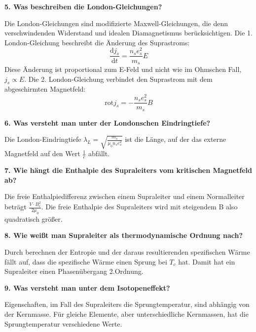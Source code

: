 \noindent\textbf{5. Was beschreiben die London-Gleichungen?}\\
\begin{addmargin}[25pt]{0pt}
Die London-Gleichungen sind modifizierte Maxwell-Gleichungen, die denn verschwindenden Widerstand und idealen Diamagnetismus berücksichtigen. Die 1. London-Gleichung beschreibt die Änderung des Suprastroms:
\begin{equation}
    \frac{\text{d}j_s}{\text{d}t}=\frac{n_se_s^2}{m_s}E
\end{equation}
Diese Änderung ist proportional zum E-Feld und nicht wie im Ohmschen Fall, $j_s\propto E$.
Die 2. London-Gleichung verbindet den Suprastrom mit dem abgeschirmten Magnetfeld:
\begin{equation}
    \text{rot} j_s = -\frac{n_se_s^2}{m_s}B
\end{equation}
\end{addmargin}

\noindent\textbf{6. Was versteht man unter der Londonschen Eindringtiefe?}\\
\begin{addmargin}[25pt]{0pt}
Die London-Eindringtiefe $\lambda_L=\sqrt{\frac{m_s}{\mu_0n_se_s^2}}$ ist die Länge, auf der das externe Magnetfeld auf den Wert $\frac{1}{e}$ abfällt.
\end{addmargin}

\noindent\textbf{7. Wie hängt die Enthalpie des Supraleiters vom kritischen Magnetfeld ab?}\\
\begin{addmargin}[25pt]{0pt}
Die freie Enthalpiedifferenz zwischen einem Supraleiter und einem Normalleiter beträgt $\frac{V\cdot B_c^2}{2\mu_0}$. Die freie Enthalpie des Supraleiters wird mit steigendem B also quadratisch größer.
\end{addmargin}

\noindent\textbf{8. Wie weißt man Supraleiter als thermodynamische Ordnung nach?}\\
\begin{addmargin}[25pt]{0pt}
Durch berechnen der Entropie und der daraus resultierenden spezifischen Wärme fällt auf, dass die spezifische Wärme einen Sprung bei $T_c$ hat. Damit hat ein Supraleiter einen Phasenübergang 2.Ordnung.
\end{addmargin}

\noindent\textbf{9. Was versteht man unter dem Isotopeneffekt?}\\
\begin{addmargin}[25pt]{0pt}
Eigenschaften, im Fall des Supraleiters die Sprungtemperatur, sind abhängig von der Kernmasse. Für gleiche Elemente, aber unterschiedliche Kernmassen, hat die Sprungtemperatur verschiedene Werte.
\end{addmargin}

